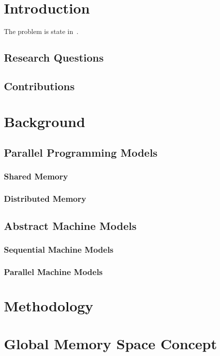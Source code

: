 \chapter{Introduction}
The problem is state in~\cite{Bringhurst12}.
\section{Research Questions}
\section{Contributions}
\chapter{Background}
\section{Parallel Programming Models}
\subsection{Shared Memory}
\subsection{Distributed Memory}
\section{Abstract Machine Models}
\subsection{Sequential Machine Models}
\subsection{Parallel Machine Models}
\chapter{Methodology}
\chapter{Global Memory Space Concept}
